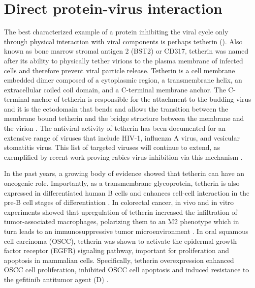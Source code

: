 \documentclass{enslyonreview}
\begin{document}
\section{Direct protein-virus interaction}

The best characterized example of a protein inhibiting the viral cycle only through physical
interaction with viral components is perhaps tetherin (). Also known as
bone marrow stromal antigen 2 (BST2) or CD317, tetherin was named after its ability to
physically tether virions to the plasma membrane of infected cells and therefore prevent viral
particle release. Tetherin is a cell membrane embedded dimer composed of a cytoplasmic region,
a transmembrane helix, an extracellular coiled coil domain, and a C-terminal membrane anchor.
The C-terminal anchor of tetherin is responsible for the attachment to the budding virus and
it is the ectodomain that bends and allows the transition between the membrane bound tetherin
and the bridge structure between the membrane and the virion \cite{ozcanBendingBST2Coiledcoil2017}. The antiviral
activity of tetherin has been documented for an extensive range of viruses that include HIV-1,
influenza A virus, and vesicular stomatitis virus. This list of targeted viruses will continue
to extend, as exemplified by recent work proving rabies virus inhibition via this mechanism
\cite{tanwattanaHumanBST2Inhibits2023}.

In the past years, a growing body of evidence showed that tetherin can have an oncogenic role.
Importantly, as a transmembrane glycoprotein, tetherin is also expressed in differentiated
human B cells and enhances cell-cell interaction in the pre-B cell stages of differentiation
\cite{jinBST2PromotesGrowth2019}. In colorectal cancer, in vivo and in vitro experiments showed that upregulation
of tetherin increased the infiltration of tumor-associated macrophages, polarizing them to an
M2 phenotype which in turn leads to an immunosuppressive tumor microenvironment
\cite{heBST2InducedMacrophage2023}. In oral squamous cell carcinoma (OSCC), tetherin was shown to activate the
epidermal growth factor receptor (EGFR) signaling pathway, important for proliferation and
apoptosis in mammalian cells. Specifically, tetherin overexpression enhanced OSCC cell
proliferation, inhibited OSCC cell apoptosis and induced resistance to the gefitinib
antitumor agent (D) \cite{jinBST2PromotesGrowth2019}.
\end{document}
